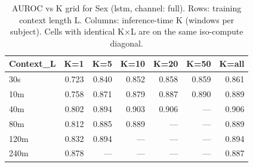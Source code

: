 \begin{table}[ht]
\centering
\caption{AUROC vs K grid for Sex (lstm, channel: full). Rows: training context length L. Columns: inference-time K (windows per subject). Cells with identical K×L are on the same iso-compute diagonal.}
\label{tab:kgrid_sex_binary_lstm_full}
\begin{tabular}{lrrrrrr}
\toprule
Context_L & K=1 & K=5 & K=10 & K=20 & K=50 & K=all \\
\midrule
30s & 0.723 & 0.840 & 0.852 & 0.858 & 0.859 & 0.861 \\
10m & 0.758 & 0.871 & 0.879 & 0.887 & 0.890 & 0.889 \\
40m & 0.802 & 0.894 & 0.903 & 0.906 & — & 0.906 \\
80m & 0.812 & 0.885 & 0.889 & — & — & 0.889 \\
120m & 0.832 & 0.894 & — & — & — & 0.894 \\
240m & 0.878 & — & — & — & — & 0.887 \\
\bottomrule
\end{tabular}
\end{table}